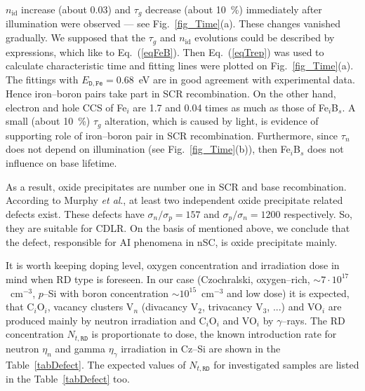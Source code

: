 \documentclass[aip,jap, amsmath,amssymb,reprint]{revtex4-1}
\begin{document}
$n_{\mathrm{id}}$ increase (about 0.03) and $\tau_g$ decrease (about 10~\%) immediately after illumination were observed --- see Fig.~\ref{fig_Time}(a).
These changes vanished gradually.
We supposed that the $\tau_g$ and $n_{\mathrm{id}}$ evolutions could be described by expressions, which like to Eq.~(\ref{eqFeB}).
Then Eq.~(\ref{eqTrep}) was used to calculate characteristic time and fitting lines were plotted on Fig.~\ref{fig_Time}(a).
The fittings with $E_{\mathtt{D,Fe}}=0.68$~eV are in good agreement with experimental data.
Hence iron--boron pairs take part in SCR recombination.
On the other hand, electron and hole CCS of Fe$_i$ are 1.7 and 0.04 times \cite{MurphyJAP2011} as much as those of Fe$_i$B$_s$.
A small (about 10~\%) $\tau_g$ alteration, which is caused by light, is evidence of supporting role of iron--boron pair in SCR recombination.
Furthermore, since $\tau_n$ does not depend on illumination (see Fig.~\ref{fig_Time}(b)), then Fe$_i$B$_s$ does not influence on base lifetime.

As a result, oxide precipitates are number one in SCR and base recombination.
According to Murphy \emph{et al}.\cite{MurphySC2014,MurphyJAP2012},
at least two independent oxide precipitate related defects exist.
These defects have $\sigma_n/\sigma_p=157$ and $\sigma_p/\sigma_n=1200$ respectively.\cite{MurphyJAP2012}
So, they are suitable for CDLR.
On the basis of mentioned above, we conclude that the defect, responsible for AI phenomena in nSC, is oxide precipitate mainly.

It is worth keeping doping level, oxygen concentration and irradiation dose in mind when RD type is foreseen.
In our case (Czochralski, oxygen--rich, $\sim7\cdot10^{17}$~cm$^{-3}$, $p$--Si with boron concentration $\sim10^{15}$~cm$^{-3}$ and low dose)
it is expected, that C$_i$O$_i$, vacancy clusters V$_n$ (divacancy V$_2$, trivacancy V$_3$, ...) and VO$_i$
are produced mainly by neutron irradiation \cite{n:long,n:gamma,Moll:PhD}
and C$_i$O$_i$ and  VO$_i$ by $\gamma$--rays.\cite{gamma:Stahl,Moll:PhD,gamma:Kolk,A:Caracas}
The RD concentration $N_{t,\mathtt{RD}}$ is proportionate to dose,
the known introduction rate for neutron $\eta_n$ and gamma $\eta_\gamma$ irradiation in Cz--Si are shown in the Table~\ref{tabDefect}.
The expected values of $N_{t,\mathtt{RD}}$ for investigated samples are listed in the Table~\ref{tabDefect} too.
\end{document}

